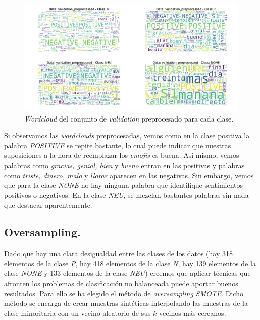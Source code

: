 \documentclass[11pt]{article}
\begin{document}
\begin{figure}[H]
\includegraphics[width=\linewidth]{images/wordcloud/wordcloud_validation_preprocessed.png}
\caption{\textit{Wordcloud} del conjunto de \textit{validation} preprocesado para cada clase.}
\end{figure}

Si observamos las \textit{wordclouds} preprocesadas, vemos como en la clase positiva la palabra \textit{POSITIVE} se repite bastante, lo cual puede indicar que nuestras suposiciones a la hora de reemplazar los \textit{emojis} es buena. Así mismo, vemos palabras como \textit{gracias, genial, bien} y \textit{bueno} entran en las positivas y palabras como \textit{triste, dinero, malo} y \textit{llorar} aparecen en las negativas. Sin embargo, vemos que para la clase \textit{NONE} no hay ninguna palabra que identifique sentimientos positivos o negativos. En la clase \textit{NEU}, se mezclan bastantes palabras sin nada que destacar aparentemente.

\subsection{Oversampling.}
Dado que hay una clara desigualdad entre las clases de los datos (hay 318 elementos de la clase \textit{P}, hay 418  elementos de la clase \textit{N}, hay 139 elementos de la clase \textit{NONE} y 133 elementos de la clase \textit{NEU}) creemos que aplicar técnicas que afronten los problemas de clasificación no balanceada puede aportar buenos resultados. Para ello se ha elegido el método de \textit{oversampling} \textit{SMOTE}. Dicho método se encarga de crear muestras sintéticas interpolando las muestras de la clase minoritaria con un vecino aleatorio de sus $k$ vecinos más cercanos.\\
\end{document}
